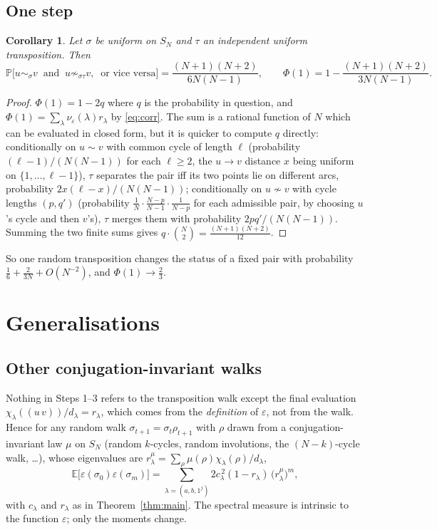 \documentclass[11pt]{amsart}
\newtheorem{corollary}[theorem]{Corollary}
\theoremstyle{remark}
\newcommand{\E}{\mathbb{E}}
\renewcommand{\Pr}{\mathbb{P}}
\newcommand{\SN}{S_N}
\begin{document}
\subsection{One step}

\begin{corollary}\label{cor:onestep}
Let $\sigma$ be uniform on $\SN$ and $\tau$ an independent uniform transposition.  Then
\[
\Pr\bigl[u\sim_\sigma v\ \text{ and }\ u\not\sim_{\sigma\tau}v,\ \text{ or vice versa}\bigr]
=\frac{(N+1)(N+2)}{6N(N-1)},
\qquad
\Phi(1)=1-\frac{(N+1)(N+2)}{3N(N-1)} .
\]
\end{corollary}

\begin{proof}
$\Phi(1)=1-2q$ where $q$ is the probability in question, and $\Phi(1)=\sum_\lambda\nu_\varepsilon(\lambda)r_\lambda$ by \eqref{eq:corr}.  The sum is a rational function of $N$ which can be evaluated in closed form, but it is quicker to compute $q$ directly: conditionally on $u\sim v$ with common cycle of length $\ell$ (probability $(\ell-1)/(N(N-1))$ for each $\ell\ge2$, the $u\to v$ distance $x$ being uniform on $\{1,\dots,\ell-1\}$), $\tau$ separates the pair iff its two points lie on different arcs, probability $2x(\ell-x)/(N(N-1))$; conditionally on $u\not\sim v$ with cycle lengths $(p,q')$ (probability $\frac1N\cdot\frac{N-p}{N-1}\cdot\frac1{N-p}$ for each admissible pair, by choosing $u$'s cycle and then $v$'s), $\tau$ merges them with probability $2pq'/(N(N-1))$.  Summing the two finite sums gives $q\cdot\binom N2=\frac{(N+1)(N+2)}{12}$.
\end{proof}

So one random transposition changes the status of a fixed pair with probability $\tfrac16+\tfrac{2}{3N}+O(N^{-2})$, and $\Phi(1)\to\tfrac23$.

\section{Generalisations}\label{sec:gen}

\subsection{Other conjugation-invariant walks}
Nothing in Steps 1--3 refers to the transposition walk except the final evaluation $\chi_\lambda((u\,v))/d_\lambda=r_\lambda$, which comes from the \emph{definition} of $\varepsilon$, not from the walk.  Hence for any random walk $\sigma_{t+1}=\sigma_t\rho_{t+1}$ with $\rho$ drawn from a conjugation-invariant law $\mu$ on $\SN$ (random $k$-cycles, random involutions, the $(N-k)$-cycle walk, \dots), whose eigenvalues are $r^\mu_\lambda=\sum_\rho\mu(\rho)\chi_\lambda(\rho)/d_\lambda$,
\[
\E\bigl[\varepsilon(\sigma_0)\varepsilon(\sigma_m)\bigr]=\sum_{\lambda=(a,b,1^j)}2c_\lambda^{\,2}(1-r_\lambda)\,\bigl(r^\mu_\lambda\bigr)^m ,
\]
with $c_\lambda$ and $r_\lambda$ as in Theorem~\ref{thm:main}.  The spectral measure is intrinsic to the function $\varepsilon$; only the moments change.
\end{document}
